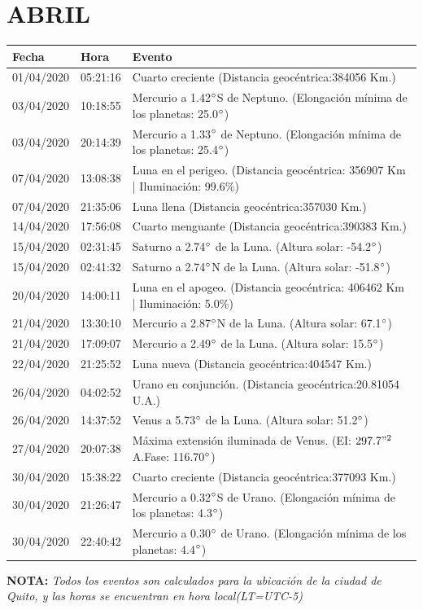 \documentclass[12pt,a4paper,oneside]{article}
\begin{document}
\section{ABRIL}
\begin{center}
\begin{tabular}{ |l| l| l| }
\hline
 \textbf{Fecha} & \textbf{Hora} & \textbf{Evento}\\
 \hline
01/04/2020 &  05:21:16   &  Cuarto creciente (Distancia geocéntrica:384056 Km.)	  \\
03/04/2020 &  10:18:55   &  Mercurio a 1.42$\degree$S de Neptuno. (Elongación mínima de los planetas: 25.0$\degree$)	  \\
03/04/2020 &  20:14:39   &  Mercurio a 1.33$\degree$ de Neptuno. (Elongación mínima de los planetas: 25.4$\degree$)	  \\
07/04/2020 &  13:08:38   &  Luna en el perigeo. (Distancia geocéntrica: 356907 Km | Iluminación: 99.6\%)	  \\
07/04/2020 &  21:35:06   &  Luna llena (Distancia geocéntrica:357030 Km.)	  \\
14/04/2020 &  17:56:08   &  Cuarto menguante (Distancia geocéntrica:390383 Km.)	  \\
15/04/2020 &  02:31:45   &  Saturno a 2.74$\degree$ de la Luna. (Altura solar: -54.2$\degree$)	  \\
15/04/2020 &  02:41:32   &  Saturno a 2.74$\degree$N de la Luna. (Altura solar: -51.8$\degree$)	  \\
20/04/2020 &  14:00:11   &  Luna en el apogeo. (Distancia geocéntrica: 406462 Km | Iluminación: 5.0\%)	  \\
21/04/2020 &  13:30:10   &  Mercurio a 2.87$\degree$N de la Luna. (Altura solar: 67.1$\degree$)	  \\
21/04/2020 &  17:09:07   &  Mercurio a 2.49$\degree$ de la Luna. (Altura solar: 15.5$\degree$)	  \\
22/04/2020 &  21:25:52   &  Luna nueva (Distancia geocéntrica:404547 Km.)	  \\
26/04/2020 &  04:02:52   &  Urano en conjunción. (Distancia geocéntrica:20.81054 U.A.)	  \\
26/04/2020 &  14:37:52   &  Venus a 5.73$\degree$ de la Luna. (Altura solar: 51.2$\degree$)	  \\ 
27/04/2020 &  20:07:38   &  Máxima extensión iluminada de Venus. (EI: $297.7"^2$ A.Fase: 116.70$\degree$) 	  \\
30/04/2020 &  15:38:22   &  Cuarto creciente (Distancia geocéntrica:377093 Km.) \\
30/04/2020 &  21:26:47   &  Mercurio a 0.32$\degree$S de Urano. (Elongación mínima de los planetas: 4.3$\degree$)	  \\
30/04/2020 &  22:40:42   &  Mercurio a 0.30$\degree$ de Urano. (Elongación mínima de los planetas: 4.4$\degree$)\\	
\hline
\end{tabular}
\end{center}
\vspace{1cm}
\textbf{NOTA:  }\textit{Todos los eventos son calculados para la ubicaci\'on de la ciudad de Quito, y las horas se encuentran en hora local(LT=UTC-5)}
\vspace{0.7cm}
\newpage
\end{document}
